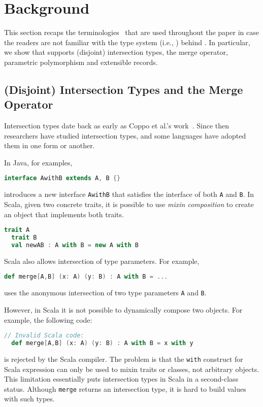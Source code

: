 
\section{Background}
\label{sec:background}

This section recaps the terminologies~\cite{oliveira2016disjoint,
  alpuimdisjoint} that are used throughout the paper in case the readers are not
familiar with the type system (i.e., \bname) behind \name. In particular, we
show that \name supports (disjoint) intersection types, the merge operator,
parametric polymorphism and extensible records.

\subsection{(Disjoint) Intersection Types and the Merge Operator}
\label{sec:intersection}

Intersection types date back as early as Coppo et al.'s
work~\cite{coppo1981functional}. Since then researchers have studied
intersection types, and some languages have adopted them in one form or another.

In Java, for examples,
\begin{lstlisting}[language=java]
  interface AwithB extends A, B {}
\end{lstlisting}
introduces a new interface \lstinline$AwithB$ that satisfies the interface of
both \lstinline{A} and \lstinline{B}. In Scala, given two concrete traits, it is
possible to use \textit{mixin composition} to create an object that implements
both traits.
\begin{lstlisting}[language=scala]
  trait A
  trait B
  val newAB : A with B = new A with B
\end{lstlisting}
Scala also allows intersection of type parameters. For example,
\begin{lstlisting}[language=scala]
  def merge[A,B] (x: A) (y: B) : A with B = ...
\end{lstlisting}
uses the anonymous intersection of two type parameters \lstinline{A} and
\lstinline{B}.

However, in Scala it is not possible to dynamically compose two objects. For
example, the following code:
\begin{lstlisting}[language=scala]
  // Invalid Scala code:
  def merge[A,B] (x: A) (y: B) : A with B = x with y
\end{lstlisting}
is rejected by the Scala compiler. The problem is that the \lstinline$with$
construct for Scala expression can only be used to mixin traits or classes, not
arbitrary objects. This limitation essentially puts intersection types in Scala
in a second-class status. Although \lstinline{merge} returns an intersection
type, it is hard to build values with such types.

